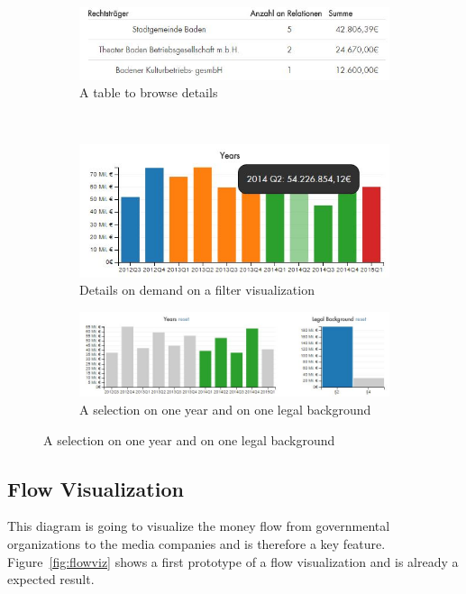 \documentclass{acmsiggraph}               %
\begin{document}
\begin{appendices}
\begin{figure}[tb]
  \begin{subfigure}{0.45\linewidth}
    \centering
      \includegraphics[width=\linewidth]{img/badentable.jpg}
      \caption{A table to browse details}
      \label{fig:table}
  \end{subfigure}   
  ~
  \begin{subfigure}{0.45\linewidth}
    \centering
      \includegraphics[width=\linewidth]{img/details.jpg}
      \caption{Details on demand on a filter visualization}
      \label{fig:details}
  \end{subfigure}

  \begin{subfigure}{0.9\linewidth}
    \centering
      \includegraphics[width=\linewidth]{img/selection.jpg}
      \caption{A selection on one year and on one legal background}
      \label{fig:selection}
  \end{subfigure}    
\label{fig:work packages}
\end{figure}

\subsection{Flow Visualization}

This diagram is going to visualize the money flow from governmental organizations to the media companies and is therefore a key feature. Figure~\ref{fig:flowviz} shows a first prototype of a flow visualization and is already a expected result.


\end{appendices}
\end{document}
